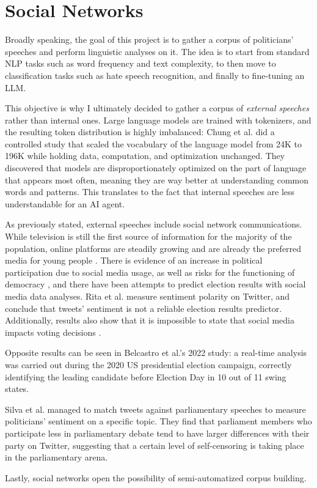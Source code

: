 \section{Social Networks}

Broadly speaking, the goal of this project is to gather a corpus of politicians' speeches and perform linguistic analyses on it. The idea is to start from standard NLP tasks such as word frequency and text complexity, to then move to classification tasks such as hate speech recognition, and finally to fine-tuning an LLM.

This objective is why I ultimately decided to gather a corpus of \textit{external speeches} rather than internal ones. Large language models are trained with tokenizers, and the resulting token distribution is highly imbalanced: Chung et al. \cite{chung_exploiting_2025} did a controlled study that scaled the vocabulary of the language model from 24K to 196K while holding data, computation, and optimization unchanged. They discovered that models are disproportionately optimized on the part of language that appears most often, meaning they are way better at understanding common words and patterns. This translates to the fact that internal speeches are less understandable for an AI agent. 

As previously stated, external speeches include social network communications. While television is still the first source of information for the majority of the population, online platforms are steadily growing and are already the preferred media for young people \cite{eurobarometer_media_2023,maher_twice_2024}. There is evidence of an increase in political participation due to social media usage, as well as risks for the functioning of democracy \cite{lorenz-spreen_systematic_2023,amsalem_people_2023}, and there have been attempts to predict election results with social media data analyses. Rita et al. measure sentiment polarity on Twitter, and conclude that tweets' sentiment is not a reliable election results predictor. Additionally, results also show that it is impossible to state that social media impacts voting decisions \cite{rita_social_2023}. 

Opposite results can be seen in Belcastro et al.'s \cite{belcastro_analyzing_2022} 2022 study: a real-time analysis was carried out during the 2020 US presidential election campaign, correctly identifying the leading candidate before Election Day in 10 out of 11 swing states.

Silva et al. \cite{silva_politicians_2022} managed to match tweets against parliamentary speeches to measure politicians' sentiment on a specific topic. They find that parliament members who participate less in parliamentary debate tend to have larger differences with their party on Twitter, suggesting that a certain level of self-censoring is taking place in the parliamentary arena.

Lastly, social networks open the possibility of semi-automatized corpus building.